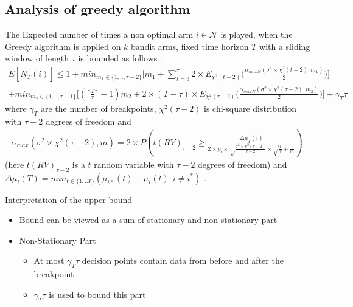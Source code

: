 \documentclass[compress, serif, onlymath, professionalfonts]{beamer}
\begin{document}
\subsection{Analysis of greedy algorithm}
\begin{frame}
\begin{footnotesize}
\begin{theorem}
\label{Greedy}
The Expected number of times a non optimal arm $i \in \mathcal{N}$ is played, when the Greedy algorithm is applied on $k$ bandit arms, fixed time horizon $T$ with a sliding window of length $\tau$ is bounded as follows :
\begin{multline*}E[\tilde{N_T}(i)] \leq 1+min_{m_1 \in \{1,..,\tau-2\}}\big[m_1+\sum_{t=3}^{\tau}2\times E_{\chi^2(t-2)}\big(\frac{\alpha_{maxN}(\sigma^2\times\chi^2(t-2),m_1)}{2}\big)\big]\\
+min_{m_2 \in \{1,..,\tau-1\}}\big[( \lceil{\frac{T}{\tau}}\rceil-1)m_2
+2\times(T-\tau) \times E_{\chi^2(\tau-2)}\big(\frac{\alpha_{maxN}(\sigma^2\times\chi^2(\tau-2),m_2)}{2}\big)\big]+\gamma_T\tau
\end{multline*}
where $\gamma_T$ are the number of breakpoints, $\chi^2(\tau-2)$ is chi-square distribution with $\tau-2$ degrees of freedom and \begin{multline*}\alpha_{max}(\sigma^2\times\chi^2(\tau-2),m)= 2\times P(t(RV)_{\tau-2} \geq \frac{\Delta\mu_T(i)}{2\times p_i \times \sqrt\frac{\sigma^2\times\chi^2(\tau-2)}{\tau-2} \times \sqrt{\frac{1}{\tau}+\frac{1}{m}}}  ).
\end{multline*} (here $t(RV)_{\tau-2}$ is a $t$ random variable with $\tau-2$ degrees of freedom) and $\Delta \mu_i(T)=min_{t \in \{1,..T\}}(\mu_{i*}(t)-\mu_i(t):i \neq i^*)$ .
\end{theorem}
\end{footnotesize}
\end{frame}
\begin{frame}{Interpretation of the upper bound}
\begin{itemize}


\item Bound can be viewed as a sum of stationary and non-stationary part

\item Non-Stationary Part
\begin{itemize}
\item  At most $\gamma_T\tau$ decision points contain data from before and after the breakpoint
\item $\gamma_T\tau$ is used to bound this part

\end{itemize}

\end{itemize}


\end{frame}
\end{document}
